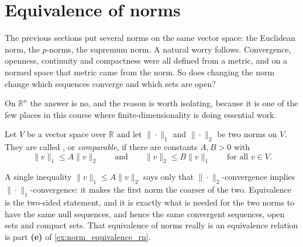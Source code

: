 
\section{Equivalence of norms}
\label{sec:equivalence_of_norms}

The previous sections put several norms on the same vector space: the Euclidean norm, the
$p$-norms, the supremum norm. A natural worry follows. Convergence, openness, continuity and
compactness were all defined from a metric, and on a normed space that metric came from the norm.
So does changing the norm change which sequences converge and which sets are open?

On $\mathbb{R}^n$ the answer is no, and the reason is worth isolating, because it is one of the
few places in this course where finite-dimensionality is doing essential work.

\begin{definition}
\label{def:equivalent_norms}
Let $V$ be a vector space over $\mathbb{R}$ and let $\|\cdot\|_1$ and $\|\cdot\|_2$ be two norms
on $V$. They are called  , or \emph{comparable}, if
there are constants $A, B > 0$ with
\[\|v\|_1 \leq A\|v\|_2 \qquad\text{and}\qquad \|v\|_2 \leq B\|v\|_1 \qquad\text{for all } v \in V.\]
\end{definition}

\begin{remark}
A single inequality $\|v\|_1 \leq A\|v\|_2$ says only that $\|\cdot\|_2$-convergence implies
$\|\cdot\|_1$-convergence: it makes the first norm the coarser of the two. Equivalence is the
two-sided statement, and it is exactly what is needed for the two norms to have the same null
sequences, and hence the same convergent sequences, open sets and compact sets. That equivalence
of norms really is an equivalence relation is part \textbf{(e)} of \cref{ex:norm_equivalence_rn}.
\end{remark}

